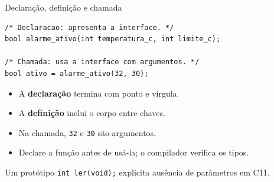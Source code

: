 \begin{frame}[fragile]{Declaração, definição e chamada}
\begin{lstlisting}
/* Declaracao: apresenta a interface. */
bool alarme_ativo(int temperatura_c, int limite_c);

/* Chamada: usa a interface com argumentos. */
bool ativo = alarme_ativo(32, 30);
\end{lstlisting}
\begin{itemize}
\item A \textbf{declaração} termina com ponto e vírgula.
\item A \textbf{definição} inclui o corpo entre chaves.
\item Na chamada, \texttt{32} e \texttt{30} são argumentos.
\item Declare a função antes de usá-la; o compilador verifica os tipos.
\end{itemize}
\small Um protótipo \texttt{int ler(void);} explicita ausência de parâmetros em C11.
\end{frame}
